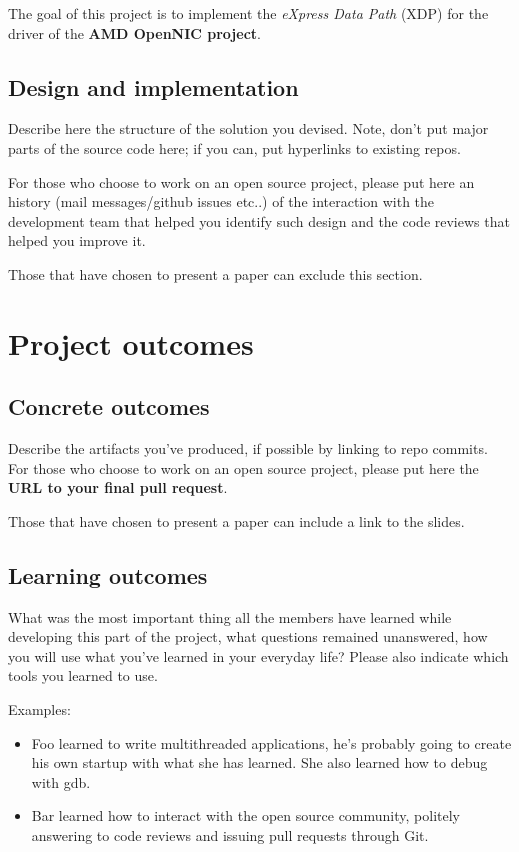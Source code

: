 \documentclass[10pt,a4]{article}
\begin{document}
The goal of this project is to implement the \textit{eXpress Data Path} (XDP) for the driver of the \textbf{AMD OpenNIC project}.


\subsection{Design and implementation}
Describe here the structure of the solution you devised. Note, don't put major
parts of the source code here; if you can, put hyperlinks to existing repos.

For those who choose to work on an open source project, please put here an
history (mail messages/github issues etc..) of the interaction with the
development team that helped you identify such design and the code reviews that
helped you improve it.

Those that have chosen to present a paper can exclude this section. 

\section{Project outcomes}

\subsection{Concrete outcomes}
Describe the artifacts you've produced, if possible by linking to repo commits.
For those who choose to work on an open source project, please put here the 
\textbf{URL to your final pull request}.

Those that have chosen to present a paper can include a link to the slides.

\subsection{Learning outcomes}

What was the most important thing all the members have learned while
developing this part of the project, what questions remained unanswered,
how you will use what you've learned in your everyday life?
Please also indicate which tools you learned to use.

Examples:

\begin{itemize}
\item Foo learned to write multithreaded applications, he's probably going to
  create his own startup with what she has learned. She also learned how to
  debug with gdb.
\item Bar learned how to interact with the open source community, politely
  answering to code reviews and issuing pull requests through Git.
\end{itemize}
\end{document}
